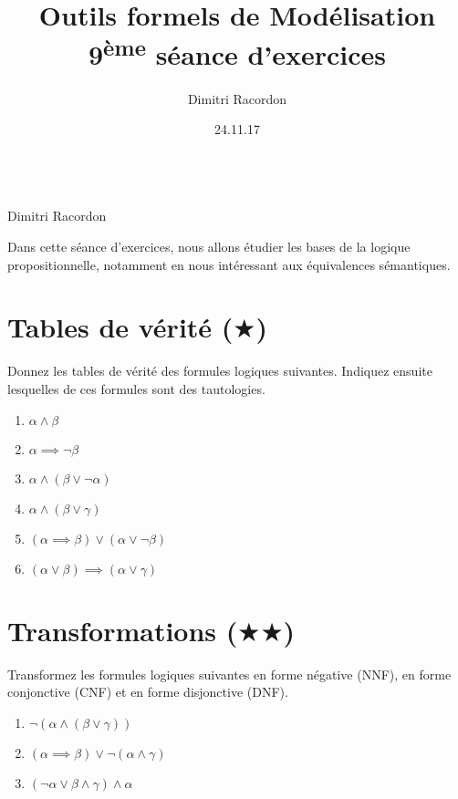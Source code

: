 \documentclass[a4paper, titlepage]{article}
\makeatletter
\numberwithin{figure}{section}
\numberwithin{table}{section}
\newcommand\objective[1]{\def\@objective{#1}}
\newcommand{\makecustomtitle}{%
	\begin{center}
		\huge\@title \\
		[1ex]\small Dimitri Racordon \\ \@date
	\end{center}
	\@objective
}
\makeatother
\begin{document}
  \title{Outils formels de Modélisation \\ 9\textsuperscript{ème} séance d'exercices}
  \author{Dimitri Racordon}
  \date{24.11.17}
	\objective{Dans cette séance d'exercices, nous allons étudier les bases de la logique propositionnelle, notamment en nous intéressant aux équivalences sémantiques.}

	\makecustomtitle

  \section{Tables de vérité ($\bigstar$)}
    Donnez les tables de vérité des formules logiques suivantes. Indiquez ensuite lesquelles de ces formules sont des tautologies.
    \begin{multicols}{2}
      \begin{enumerate}
        \item $\alpha \land \beta$
        \item $\alpha \implies \lnot\beta$
        \item $\alpha \land (\beta \lor \lnot\alpha)$
        \item $\alpha \land (\beta \lor \gamma)$
        \item $(\alpha \implies \beta) \lor (\alpha \lor \lnot\beta)$
        \item $(\alpha \lor \beta) \implies (\alpha \lor \gamma)$
      \end{enumerate}
    \end{multicols}

  \section{Transformations ($\bigstar\bigstar$)}
    Transformez les formules logiques suivantes en forme négative (NNF), en forme conjonctive (CNF) et en forme disjonctive (DNF).
    \begin{multicols}{2}
      \begin{enumerate}
        \item $\lnot(\alpha \land (\beta \lor \gamma))$
        \item $(\alpha \implies \beta) \lor \lnot(\alpha \land \gamma)$
        \item $(\lnot\alpha \lor \beta \land \gamma) \land \alpha$
      \end{enumerate}
    \end{multicols}
\end{document}

